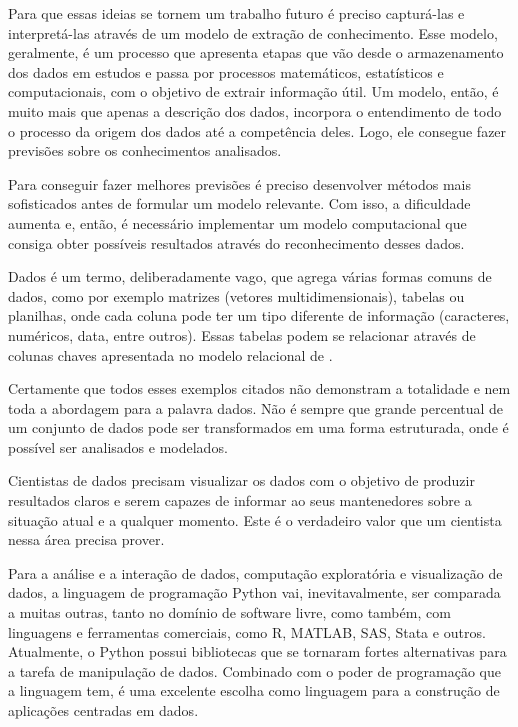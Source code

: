 Para que essas ideias se tornem um trabalho futuro é preciso capturá-las e interpretá-las através de um modelo de extração de conhecimento. Esse modelo, geralmente, é um processo que apresenta etapas que vão desde o armazenamento dos dados em estudos e passa por processos matemáticos, estatísticos e computacionais, com o objetivo de extrair informação útil. Um modelo, então, é muito mais que apenas a descrição dos dados, incorpora o entendimento de todo o processo da origem dos dados até a competência deles. Logo, ele consegue fazer previsões sobre os conhecimentos analisados.

Para conseguir fazer melhores previsões é preciso desenvolver métodos mais sofisticados antes de formular um modelo relevante. Com isso, a dificuldade aumenta e, então, é necessário implementar um modelo computacional que consiga obter possíveis resultados através do reconhecimento desses dados.

Dados é um termo, deliberadamente vago, que agrega várias formas comuns de dados, como por exemplo matrizes (vetores multidimensionais), tabelas ou planilhas, onde cada coluna pode ter um tipo diferente de informação (caracteres, numéricos, data, entre outros). Essas tabelas podem se relacionar através de colunas chaves apresentada no modelo relacional de .

Certamente que todos esses exemplos citados não demonstram a totalidade e nem toda a abordagem para a palavra dados. Não é sempre que grande percentual de um conjunto de dados pode ser transformados em uma forma estruturada, onde é possível ser analisados e modelados.

Cientistas de dados precisam visualizar os dados com o objetivo de produzir resultados claros e serem capazes de informar ao seus mantenedores sobre a situação atual e a qualquer momento. Este é o verdadeiro valor que um cientista nessa área precisa prover.

Para a análise e a interação de dados, computação exploratória e visualização de dados, a linguagem de programação Python vai, inevitavalmente, ser comparada a muitas outras, tanto no domínio de software livre, como também, com linguagens e ferramentas comerciais, como R, MATLAB, SAS, Stata e outros. Atualmente, o Python possui bibliotecas que se tornaram fortes alternativas para a tarefa de manipulação de dados. Combinado com o poder de programação que a linguagem tem, é uma excelente escolha como linguagem para a construção de aplicações centradas em dados.

